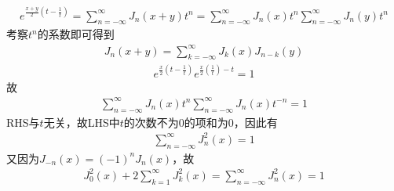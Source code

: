 \documentclass{phyasgn}
\begin{document}
\begin{pf}[4]
    \begin{align*}
        e^{\frac{x+y}{2}(t-\frac{1}{t})}=\sum_{n=-\infty}^{\infty}J_n(x+y)t^n=\sum_{n=-\infty}^{\infty}J_n(x)t^n\sum_{n=-\infty}^{\infty}J_n(y)t^n
    \end{align*}
    考察$t^n$的系数即可得到
    \begin{align*}
        J_n(x+y)=\sum_{k=-\infty}^{\infty}J_k(x)J_{n-k}(y)
    \end{align*}
    \begin{align*}
        e^{\frac{x}{2}(t-\frac{1}{t})}e^{\frac{x}{2}(\frac{1}{t})-t}=1
    \end{align*}
    故
    \begin{align*}
        \sum_{n=-\infty}^{\infty}J_n(x)t^n\sum_{n=-\infty}^{\infty}J_n(x)t^{-n}=1
    \end{align*}
    RHS与$t$无关，故LHS中$t$的次数不为0的项和为0，因此有
    \begin{align*}
        \sum_{n=-\infty}^{\infty}J_n^2(x)=1
    \end{align*}
    又因为$J_{-n}(x)=(-1)^nJ_n(x)$，故
    \begin{align*}
        J_0^2(x)+2\sum_{k=1}^{\infty}J^2_k(x)=\sum_{n=-\infty}^{\infty}J_n^2(x)=1
    \end{align*}
\end{pf}\par
\end{document}
